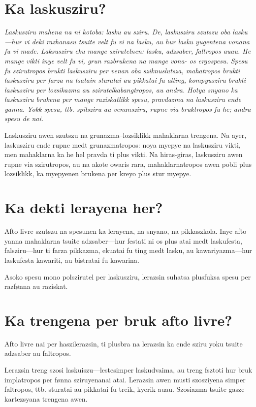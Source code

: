 \section*{Ka laskusziru?}
\it{Laskusziru} mahena na ni kotoba: \it{lasku} au \it{sziru}. De, laskusziru
szutszu oba lasku---hur vi deki razhanasu tsuite velt fu vi na lasku,
au hur lasku yugentena vonana fu vi made. Laksusziru eku mange szirutelnen:
lasku, adzsaber, faltropos auau. He mange vikti inye velt fu vi, grun
razbrukena na mange vona- os ergospesu. Spesu fu szirutropos brukti laskusziru
per venan oba sziknuslutsza, mahatropos brukti laskusziru per farza na tsatain
sturatai au pikkatai fu alting, kompyusziru brukti laskusziru per lozsikazma au
szirutelkabangtropos, au andra. Hotya snyano ka laskusziru brukena per mange
raziskatlikk spesu, pravdazma na laskusziru ende yanna. Yokk spesu, ttb.
spilsziru au venansziru, rupne via bruktropos fu he; andra spesu de nai.

Laskusziru awen szutszu na grunazma--lozsiklikk mahaklarna trengena. Na ayer,
laskusziru ende rupne medt grunazmatropos: noya myepye na laskusziru vikti,
men mahaklarna ka he hel pravda ti plus vikti. Na hiras-giras, laskusziru
awen rupne via szirutropos, au na akote owaris rara, mahaklarnatropos awen
pobli plus lozsiklikk, ka myepyenen brukena per kreyo plus stur myepye.

\section*{Ka dekti lerayena her?}
Afto livre szutszu na spesunen ka lerayena, na snyano, na pikkaszkola. Inye
afto yanna mahaklarna tsuite adzsaber---hur festati ni os plus atai medt
laskufesta, falsziru---hur ti farza pikkazma, ekuatai fu ting medt lasku,
au kawariyazma---hur laskufesta kawariti, au bistratai fu kawarina.

Asoko spesu mono polszirutel per laskusziru, lerazsin suhatsa plusfuksa
spesu per razfønna au raziskat.

\section*{Ka trengena per bruk afto livre?}
Afto livre nai per haszilerazsin, ti plusbra na lerazsin ka ende sziru yoku
tsuite adzsaber au faltropos.

Lerazsin treng szosi laskuiszu---lestesimper laskudvaima, au treng fsztoti hur
bruk implatropos per fønna sziruyenanai atai. Lerazsin
awen musti szosziyena simper faltropos, ttb. sturatai au pikkatai
fu treik, kyerik auau. Szosiazma tsuite gasze kartezsyana trengena awen.

